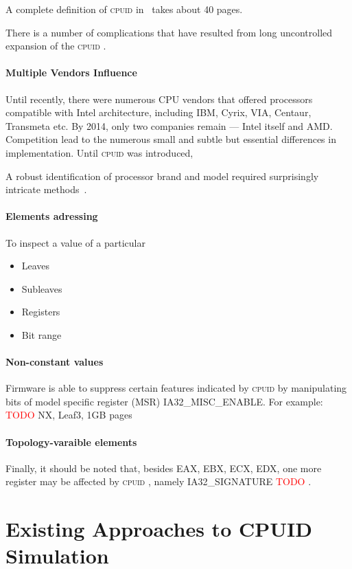 \documentclass[a4paper,10pt,oneside,unicode]{article}
\newcommand{\cpuid}{\textsc{cpuid} }
\newcommand{\todo}[1][]{\textcolor{red}{TODO #1}}
\begin{document}
A complete definition of \cpuid in~\cite{intelmanual-7vols} takes about 40 pages.

There is a number of complications that have resulted from long uncontrolled expansion of the \cpuid.

\paragraph{Multiple Vendors Influence} Until recently, there were numerous CPU vendors that offered processors compatible with Intel architecture, including IBM, Cyrix, VIA, Centaur, Transmeta etc. By 2014, only two companies remain --- Intel itself and AMD. Competition lead to the numerous small and subtle but essential differences in implementation. Until \cpuid was introduced, 

A robust identification of processor brand and model required surprisingly intricate methods~\cite{cpuid-wars}.



\paragraph{Elements adressing}

To inspect a value of a particular
\begin{itemize}
\item Leaves
\item Subleaves
\item Registers
\item Bit range
\end{itemize}


\paragraph{Non-constant values} Firmware is able to suppress certain features indicated by \cpuid by manipulating bits of model specific register (MSR) IA32\_MISC\_ENABLE. For example: \todo{NX, Leaf3, 1GB pages}

\paragraph{Topology-varaible elements}

Finally, it should be noted that, besides EAX, EBX, ECX, EDX, one more register may be affected by \cpuid, namely IA32\_SIGNATURE \todo.

\section{Existing Approaches to CPUID Simulation}
\end{document}
